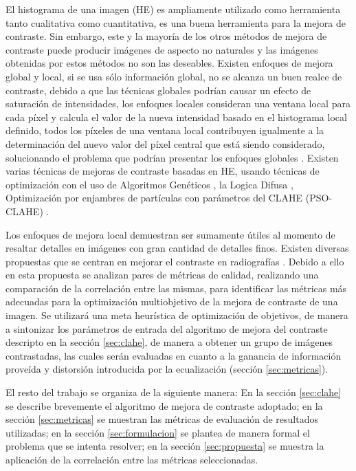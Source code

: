 \documentclass[spanish,twocolumn]{article}
\begin{document}
El histograma de una imagen (HE) \cite{he} es ampliamente utilizado como herramienta tanto cualitativa como cuantitativa, es una buena herramienta para la mejora de contraste. Sin embargo, este y la mayoría de los otros métodos de mejora de contraste puede producir imágenes de aspecto no naturales y las imágenes obtenidas por estos métodos no son las deseables. Existen enfoques de mejora global y local, si se usa sólo información global, no se alcanza un buen realce de contraste, debido a que las técnicas globales podrían causar un efecto de saturación de intensidades, los enfoques locales consideran una ventana local para cada píxel y calcula el valor de la nueva intensidad basado en el histograma local definido, todos los píxeles de una ventana local contribuyen igualmente a la determinación del nuevo valor del píxel central que está siendo considerado, solucionando el problema que podrían presentar los enfoques globales \cite{1419470}. Existen varias técnicas de mejoras de contraste basadas en HE, usando técnicas de optimización con el uso de Algoritmos Genéticos \cite{geneticAlgorithm}, la Logica Difusa \cite{fuzzy}, Optimización por enjambres de partículas con parámetros del CLAHE (PSO-CLAHE) \cite{morebrizuela2014}.
 
Los enfoques de mejora local demuestran ser sumamente útiles al momento de resaltar detalles en imágenes con gran cantidad de detalles finos. Existen diversas propuestas que se centran en mejorar el contraste en radiografías \cite{1625082,4712472,5360176}. Debido a ello en esta propuesta se analizan pares de métricas de calidad, realizando una comparación de la correlación entre las mismas, para identificar las métricas más adecuadas para la optimización multiobjetivo de la mejora de contraste de una imagen. 
Se utilizará una meta heurística de optimización de objetivos, de manera a sintonizar los parámetros de entrada del algoritmo de mejora del contraste descripto en la sección \ref{sec:clahe}, de manera a obtener un grupo de imágenes contrastadas, las cuales serán evaluadas en cuanto a la ganancia de información proveída y distorsión introducida por la ecualización (sección \ref{sec:metricas}).

El resto del trabajo se organiza de la siguiente manera: En la sección \ref{sec:clahe} se describe brevemente el algoritmo de mejora de contraste adoptado; en la sección \ref{sec:metricas} se muestran las métricas de evaluación de resultados utilizadas; en la sección \ref{sec:formulacion} se plantea de manera formal el problema que se intenta resolver; en la sección \ref{sec:propuesta} se muestra la aplicación de la correlación entre las métricas seleccionadas. %
\end{document}

